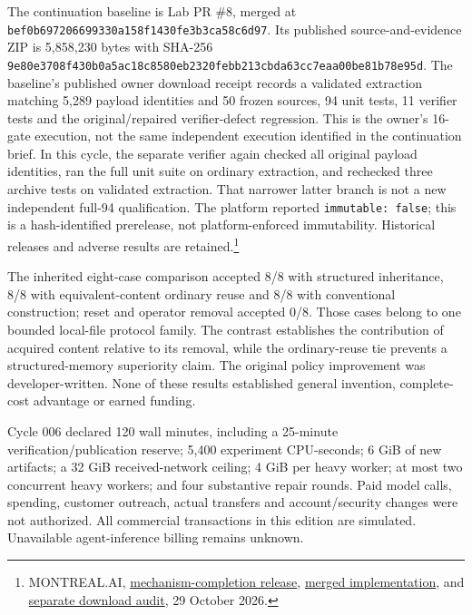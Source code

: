 \documentclass[
  10pt,
]{article}
\begin{document}
The continuation baseline is Lab PR \#8, merged at
\nolinkurl{bef0b697206699330a158f1430fe3b3ca58c6d97}. Its published
source-and-evidence ZIP is 5,858,230 bytes with SHA-256
\nolinkurl{9e80e3708f430b0a5ac18c8580eb2320febb213cbda63cc7eaa00be81b78e95d}.
The baseline's published owner download receipt records a validated
extraction matching 5,289 payload identities and 50 frozen sources, 94
unit tests, 11 verifier tests and the original/repaired verifier-defect
regression. This is the owner's 16-gate execution, not the same
independent execution identified in the continuation brief. In this
cycle, the separate verifier again checked all original payload
identities, ran the full unit suite on ordinary extraction, and
rechecked three archive tests on validated extraction. That narrower
latter branch is not a new independent full-94 qualification. The
platform reported \texttt{immutable:\ false}; this is a hash-identified
prerelease, not platform-enforced immutability. Historical releases and
adverse results are retained.\footnote{MONTREAL.AI,
  \href{https://github.com/MontrealAI/AGI-Alpha-Invention-Flywheel-Lab/releases/tag/mechanism-completion-20261029-r1}{mechanism-completion
  release},
  \href{https://github.com/MontrealAI/AGI-Alpha-Invention-Flywheel-Lab/pull/8}{merged
  implementation}, and
  \href{https://github.com/MontrealAI/AGI-Alpha-Invention-Flywheel-Lab/pull/9}{separate
  download audit}, 29 October 2026.}

The inherited eight-case comparison accepted 8/8 with structured
inheritance, 8/8 with equivalent-content ordinary reuse and 8/8 with
conventional construction; reset and operator removal accepted 0/8.
Those cases belong to one bounded local-file protocol family. The
contrast establishes the contribution of acquired content relative to
its removal, while the ordinary-reuse tie prevents a structured-memory
superiority claim. The original policy improvement was
developer-written. None of these results established general invention,
complete-cost advantage or earned funding.

Cycle 006 declared 120 wall minutes, including a 25-minute
verification/publication reserve; 5,400 experiment CPU-seconds; 6 GiB of
new artifacts; a 32 GiB received-network ceiling; 4 GiB per heavy
worker; at most two concurrent heavy workers; and four substantive
repair rounds. Paid model calls, spending, customer outreach, actual
transfers and account/security changes were not authorized. All
commercial transactions in this edition are simulated. Unavailable
agent-inference billing remains unknown.
\end{document}
